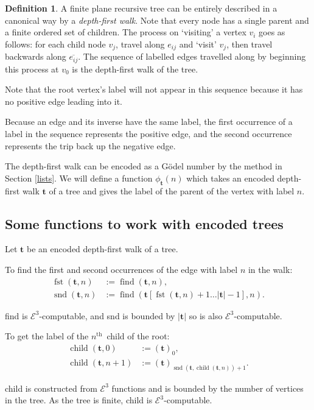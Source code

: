 \documentclass[a4paper]{article}
\newcommand{\grz}[1]{$\mathcal{E}^{#1}$}	%
\newcommand{\nth}{$n^{\textrm{th}}$~}	%
\newcommand{\tvec}{\mathbf{t}}	%
\newcommand{\recur}[1]{\begin{equation} \begin{split} #1 \end{split} \end{equation}}	%
\theoremstyle{plain}
\theoremstyle{definition}
\newtheorem{definition}[theorem]{Definition}
\begin{document}
\begin{definition}
A finite plane recursive tree can be entirely described in a canonical way by a {\it depth-first walk}. Note that every node has a single parent and a finite ordered set of children. The process on `visiting' a vertex $v_i$ goes as follows: for each child node $v_j$, travel along $e_{ij}$ and `visit' $v_j$, then travel backwards along $\overline{e_{ij}}$. The sequence of labelled edges travelled along by beginning this process at $v_0$ is the depth-first walk of the tree.
\end{definition}

Note that the root vertex's label will not appear in this sequence because it has no positive edge leading into it. 

Because an edge and its inverse have the same label, the first occurrence of a label in the sequence represents the positive edge, and the second occurrence represents the trip back up the negative edge.

The depth-first walk can be encoded as a G\"odel number by the method in Section \ref{lists}. We will define a function $\phi_{\tvec}(n)$ which takes an encoded depth-first walk $\tvec$ of a tree and gives the label of the parent of the 
vertex with label $n$. 

\subsection{Some functions to work with encoded trees}\label{encodetrees}

Let $\tvec$ be an encoded depth-first walk of a tree.

To find the first and second occurrences of the edge with label $n$ in the walk:
\recur{
\operatorname{fst}(\tvec,n) &:= \operatorname{find}(\tvec,n), \\
\operatorname{snd}(\tvec,n) &:= \operatorname{find}\left( \tvec[\operatorname{fst}(\tvec,n)+1 \dots |\tvec|-1],n \right).
}

find is \grz{3}-computable, and snd is bounded by $|\tvec|$ so is also \grz{3}-computable.

To get the label of the \nth child of the root:
\recur{
\operatorname{child}(\tvec,0) &:= (\tvec)_0, \\
\operatorname{child}(\tvec,n+1) &:= (\tvec)_{\operatorname{snd}(\tvec,\operatorname{child}(\tvec,n))+1}.
}

child is constructed from \grz{3} functions and is bounded by the number of vertices in the tree. As the tree is finite, child is \grz{3}-computable.
\end{document}

